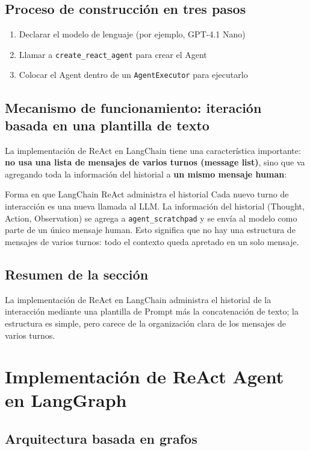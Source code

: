 \documentclass[a4paper]{article}
\begin{document}
\subsection{Proceso de construcción en tres pasos}

\begin{enumerate}
    \item Declarar el modelo de lenguaje (por ejemplo, GPT-4.1 Nano)
    \item Llamar a \texttt{create\_react\_agent} para crear el Agent
    \item Colocar el Agent dentro de un \texttt{AgentExecutor} para ejecutarlo
\end{enumerate}

\subsection{Mecanismo de funcionamiento: iteración basada en una plantilla de texto}

La implementación de ReAct en LangChain tiene una característica importante: \textbf{no usa una lista de mensajes de varios turnos (message list)}, sino que va agregando toda la información del historial a \textbf{un mismo mensaje human}:

\begin{warningbox}{Forma en que LangChain ReAct administra el historial}
Cada nuevo turno de interacción es una nueva llamada al LLM. La información del historial (Thought, Action, Observation) se agrega a \texttt{agent\_scratchpad} y se envía al modelo como parte de un único mensaje human. Esto significa que no hay una estructura de mensajes de varios turnos: todo el contexto queda apretado en un solo mensaje.
\end{warningbox}

\subsection{Resumen de la sección}
La implementación de ReAct en LangChain administra el historial de la interacción mediante una plantilla de Prompt más la concatenación de texto; la estructura es simple, pero carece de la organización clara de los mensajes de varios turnos.

\section{Implementación de ReAct Agent en LangGraph}

\subsection{Arquitectura basada en grafos}
\end{document}
